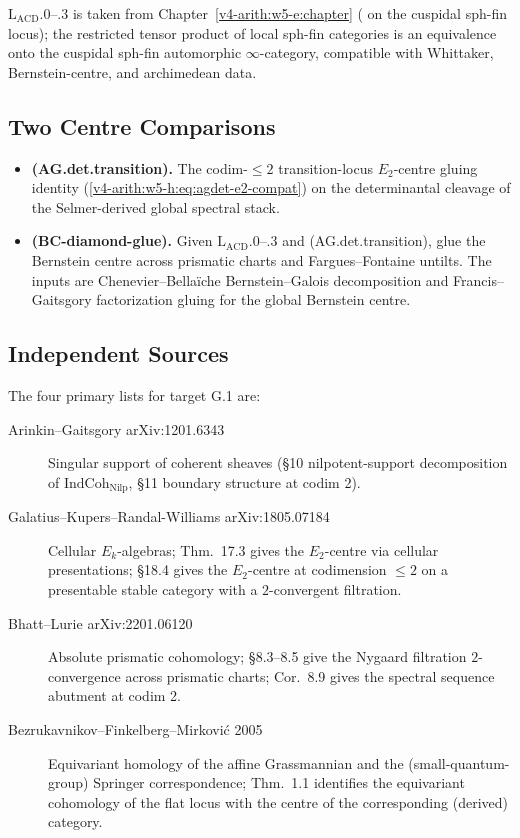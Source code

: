 \(\mathrm{L}_{\mathrm{ACD}}\).\(0\)--.\(3\) is taken from
Chapter~\ref{v4-arith:w5-e:chapter}
( on the cuspidal sph-fin
locus); the restricted tensor product of local sph-fin categories
is an equivalence onto the cuspidal sph-fin automorphic
\(\infty\)-category, compatible with Whittaker, Bernstein-centre,
and archimedean data.

\subsection{Two Centre Comparisons}

\begin{itemize}
\item \textbf{(AG.det.transition).} The codim-\(\leq
2\) transition-locus \(E_{2}\)-centre gluing identity
(\ref{v4-arith:w5-h:eq:agdet-e2-compat}) on the determinantal
cleavage of the Selmer-derived global spectral stack.
\item \textbf{(BC-diamond-glue).} Given
\(\mathrm{L}_{\mathrm{ACD}}\).\(0\)--.\(3\) and
(AG.det.transition), glue the Bernstein centre across prismatic charts
and Fargues--Fontaine untilts. The inputs are Chenevier--Bella\"iche Bernstein--Galois
decomposition and Francis--Gaitsgory factorization gluing for the
global Bernstein centre.
\end{itemize}

\subsection{Independent Sources}

The four primary lists for target G.1 are:
\begin{description}
\item[Arinkin--Gaitsgory arXiv:1201.6343] Singular support of coherent
sheaves (\S 10 nilpotent-support decomposition of
\(\mathrm{IndCoh}_{\mathrm{Nilp}}\), \S 11 boundary structure at
codim 2).
\item[Galatius--Kupers--Randal-Williams arXiv:1805.07184]
Cellular \(E_{k}\)-algebras; Thm.~17.3 gives the \(E_{2}\)-centre via
cellular presentations; \S 18.4 gives the \(E_{2}\)-centre at
codimension \(\leq 2\) on a presentable stable category with a
\(2\)-convergent filtration.
\item[Bhatt--Lurie arXiv:2201.06120] Absolute prismatic cohomology;
\S 8.3--8.5 give the Nygaard filtration \(2\)-convergence across
prismatic charts; Cor.~8.9 gives the spectral sequence abutment at
codim 2.
\item[Bezrukavnikov--Finkelberg--Mirkovi\'c 2005]
Equivariant homology of the affine Grassmannian and the
(small-quantum-group) Springer correspondence; Thm.~1.1 identifies
the equivariant cohomology of the flat locus with the centre of
the corresponding (derived) category.
\end{description}

